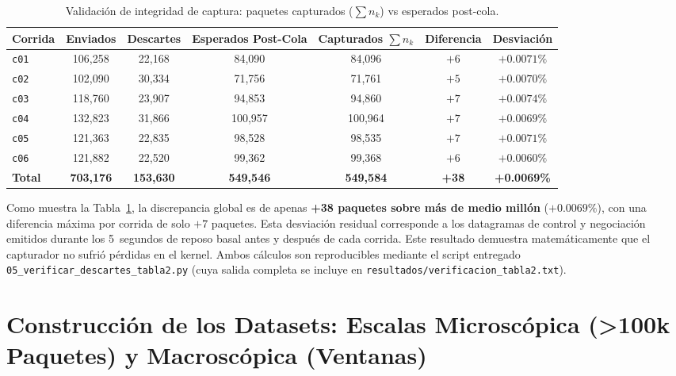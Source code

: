 \documentclass[11pt,a4paper]{article}
\begin{document}
\begin{table}[H]
\centering
\footnotesize
\caption{Validación de integridad de captura: paquetes capturados ($\sum n_k$) vs esperados post-cola.}
\label{tab:validacion_captura}
\begin{tabularx}{\textwidth}{Xcccccc}
\toprule
\textbf{Corrida} & \textbf{Enviados} & \textbf{Descartes} & \textbf{Esperados Post-Cola} & \textbf{Capturados $\sum n_k$} & \textbf{Diferencia} & \textbf{Desviación} \\
\midrule
\texttt{c01} & 106,258 & 22,168 & 84,090 & 84,096 & $+6$ & $+0.0071\%$ \\
\texttt{c02} & 102,090 & 30,334 & 71,756 & 71,761 & $+5$ & $+0.0070\%$ \\
\texttt{c03} & 118,760 & 23,907 & 94,853 & 94,860 & $+7$ & $+0.0074\%$ \\
\texttt{c04} & 132,823 & 31,866 & 100,957 & 100,964 & $+7$ & $+0.0069\%$ \\
\texttt{c05} & 121,363 & 22,835 & 98,528 & 98,535 & $+7$ & $+0.0071\%$ \\
\texttt{c06} & 121,882 & 22,520 & 99,362 & 99,368 & $+6$ & $+0.0060\%$ \\
\midrule
\textbf{Total} & \textbf{703,176} & \textbf{153,630} & \textbf{549,546} & \textbf{549,584} & \textbf{+38} & \textbf{+0.0069\%} \\
\bottomrule
\end{tabularx}
\end{table}

Como muestra la Tabla~\ref{tab:validacion_captura}, la discrepancia global es de apenas \textbf{+38 paquetes sobre más de medio millón} ($+0.0069\%$), con una diferencia máxima por corrida de solo $+7$ paquetes. Esta desviación residual corresponde a los datagramas de control y negociación emitidos durante los 5~segundos de reposo basal antes y después de cada corrida. Este resultado demuestra matemáticamente que el capturador no sufrió pérdidas en el kernel. Ambos cálculos son reproducibles mediante el script entregado \texttt{05\_verificar\_descartes\_tabla2.py} (cuya salida completa se incluye en \texttt{resultados/verificacion\_tabla2.txt}).

\section{Construcción de los Datasets: Escalas Microscópica (>100k Paquetes) y Macroscópica (Ventanas)}
\end{document}
